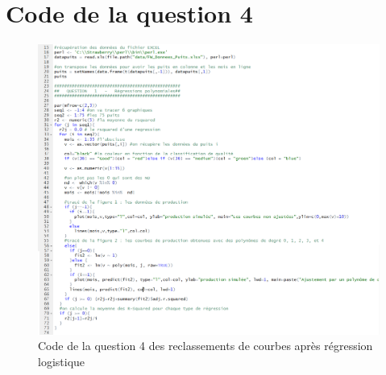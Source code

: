 \documentclass[12pt]{article}
\begin{document}
\section{Code de la question 4}
\begin{figure}[H]
 \centering %
	\includegraphics[width=600px]{code_q1}
  \caption{\label{fig:code_q4} Code de la question 4 des reclassements de courbes apr\`es r\'egression logistique}
\end{figure}
\end{document}
